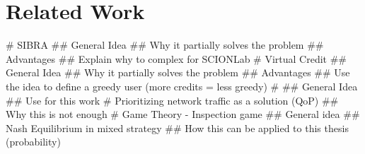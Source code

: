 \documentclass[thesis.tex]{subfiles}
\begin{document}
\section{Related Work}\label{chap:prevwork}

\begin{easylist}
	\MyListProperties
	# SIBRA \cite{Basescu.2016}
	## General Idea
	## Why it partially solves the problem
	## Advantages
	## Explain why to complex for SCIONLab
	# Virtual Credit \cite{DennisMeyer.2017}
	## General Idea
	## Why it partially solves the problem
	## Advantages
	## Use the idea to define a greedy user (more credits = less greedy)
	# \cite{Zhu.2014}
	## General Idea
	## Use for this work
	# Prioritizing network traffic as a solution (QoP)
	## Why this is not enough 
	# Game Theory - Inspection game
	## General idea
	## Nash Equilibrium in mixed strategy
	## How this can be applied to this thesis (probability)
\end{easylist}

\subfilebib %
\end{document}
